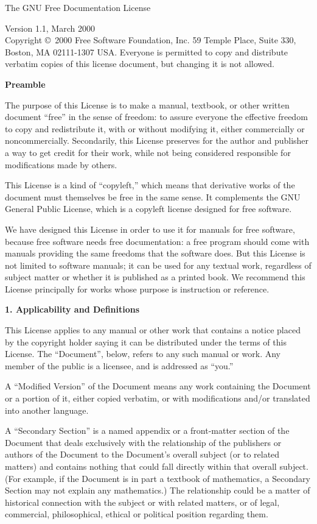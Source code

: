 \documentclass{doc}
\begin{document}
The GNU Free Documentation License\label{gfdl}

\noindent{}Version 1.1, March 2000\\


 \noindent{}Copyright \copyright\ 2000  Free Software Foundation, Inc.
59 Temple Place, Suite 330, Boston, MA  02111-1307  USA. 
 Everyone is permitted to copy and distribute verbatim copies
 of this license document, but changing it is not allowed.

\noindent\textbf{Preamble}

The purpose of this License is to make a manual, textbook, or other
written document ``free'' in the sense of freedom: to assure everyone
the effective freedom to copy and redistribute it, with or without
modifying it, either commercially or noncommercially.  Secondarily,
this License preserves for the author and publisher a way to get
credit for their work, while not being considered responsible for
modifications made by others.

This License is a kind of ``copyleft,'' which means that derivative
works of the document must themselves be free in the same sense.  It
complements the GNU General Public License, which is a copyleft
license designed for free software.

We have designed this License in order to use it for manuals for free
software, because free software needs free documentation: a free
program should come with manuals providing the same freedoms that the
software does.  But this License is not limited to software manuals;
it can be used for any textual work, regardless of subject matter or
whether it is published as a printed book.  We recommend this License
principally for works whose purpose is instruction or reference.

\noindent\textbf{1. Applicability and Definitions}

This License applies to any manual or other work that contains a
notice placed by the copyright holder saying it can be distributed
under the terms of this License.  The ``Document'', below, refers to any
such manual or work.  Any member of the public is a licensee, and is
addressed as ``you.''

A ``Modified Version'' of the Document means any work containing the
Document or a portion of it, either copied verbatim, or with
modifications and/or translated into another language.

A ``Secondary Section'' is a named appendix or a front-matter section of
the Document that deals exclusively with the relationship of the
publishers or authors of the Document to the Document's overall subject
(or to related matters) and contains nothing that could fall directly
within that overall subject.  (For example, if the Document is in part a
textbook of mathematics, a Secondary Section may not explain any
mathematics.)  The relationship could be a matter of historical
connection with the subject or with related matters, or of legal,
commercial, philosophical, ethical or political position regarding
them.
\end{document}
